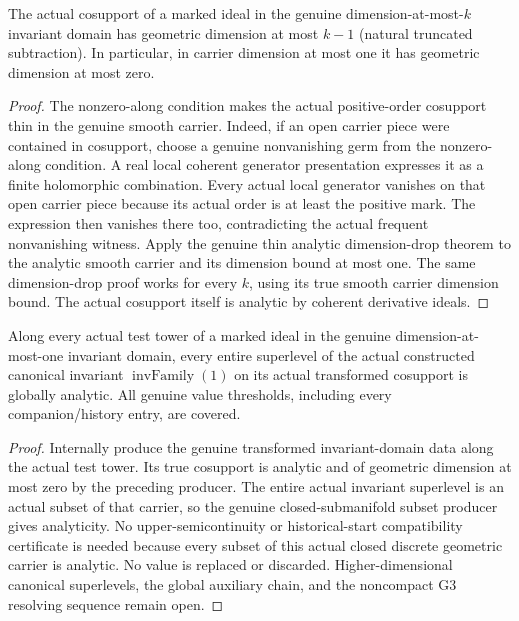 \begin{lemma}
\label{hir:one-dimensional-actual-cosupport-dimension}
\leanok
The actual cosupport of a marked ideal in the genuine dimension-at-most-$k$
invariant domain has geometric dimension at most $k-1$ (natural truncated
subtraction). In particular, in carrier dimension at most one it has
geometric dimension at most zero.
\end{lemma}
\begin{proof}
The nonzero-along condition makes the actual positive-order cosupport
thin in the genuine smooth carrier. Indeed, if an open carrier piece
were contained in cosupport, choose a genuine nonvanishing germ from
the nonzero-along condition. A real local coherent generator
presentation expresses it as a finite holomorphic combination. Every
actual local generator vanishes on that open carrier piece because
its actual order is at least the positive mark. The expression then
vanishes there too, contradicting the actual frequent nonvanishing
witness. Apply the genuine thin analytic dimension-drop theorem to
the analytic smooth carrier and its dimension bound at most one.
The same dimension-drop proof works for every $k$, using its true smooth
carrier dimension bound. The actual cosupport itself is analytic by
coherent derivative ideals.
\end{proof}

\begin{theorem}
\label{hir:canonical-one-dimensional-all-analytic-superlevels}
\leanok
Along every actual test tower of a marked ideal in the genuine
dimension-at-most-one invariant domain, every entire superlevel of
the actual constructed canonical invariant $\operatorname{invFamily}(1)$
on its actual transformed cosupport is globally analytic. All genuine
value thresholds, including every companion/history entry, are covered.
\end{theorem}
\begin{proof}
Internally produce the genuine transformed invariant-domain data
along the actual test tower. Its true cosupport is analytic and of
geometric dimension at most zero by the preceding producer. The
entire actual invariant superlevel is an actual subset of that
carrier, so the genuine closed-submanifold subset producer gives
analyticity. No upper-semicontinuity or historical-start compatibility
certificate is needed because every subset of this actual closed
discrete geometric carrier is analytic. No value is replaced or
discarded. Higher-dimensional canonical superlevels, the global
auxiliary chain, and the noncompact G3 resolving sequence remain open.
\end{proof}

